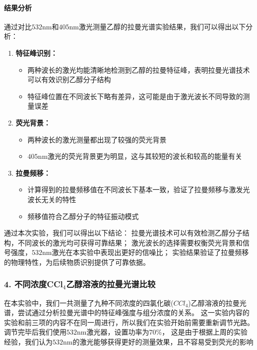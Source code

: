 \documentclass[12pt,a4paper,UTF8]{ctexart}
\begin{document}
\paragraph{结果分析}

通过对比$532\mathrm{nm}$和$405\mathrm{nm}$激光测量乙醇的拉曼光谱实验结果，我们可以得出以下分析：

\begin{enumerate}
    \item \textbf{特征峰识别：}
    \begin{itemize}
        \item 两种波长的激光均能清晰地检测到乙醇的拉曼特征峰，表明拉曼光谱技术可以有效识别乙醇分子结构
        \item 特征峰位置在不同波长下略有差异，这可能是由于激光波长不同导致的测量误差
    \end{itemize}

    \item \textbf{荧光背景：}
    \begin{itemize}
        \item 两种波长的激光测量都出现了较强的荧光背景
        \item $405\mathrm{nm}$激光的荧光背景更为明显，这与其较短的波长和较高的能量有关
    \end{itemize}

    \item \textbf{拉曼频移：}
    \begin{itemize}
        \item 计算得到的拉曼频移值在不同波长下基本一致，验证了拉曼频移与激发光波长无关的特性
        \item 频移值符合乙醇分子的特征振动模式
    \end{itemize}
\end{enumerate}

通过本次实验，我们可以得出以下结论：
拉曼光谱技术可以有效检测乙醇分子结构，不同波长的激光均可获得可靠结果；
激光波长的选择需要权衡荧光背景和信号强度，$532\mathrm{nm}$激光在本实验中表现出更好的信噪比；
实验结果验证了拉曼频移的物理特性，为后续物质识别提供了可靠依据。

\subsubsection*{4. 不同浓度CCl$_4$乙醇溶液的拉曼光谱比较}

在本实验中，我们一共测量了九种不同浓度的四氯化碳($CCl_{4}$)乙醇溶液的拉曼光谱，尝试通过分析拉曼光谱中的特征峰强度与组分浓度的关系。
这一实验内容的实验和前三项的内容不在同一周进行，所以我们在实验开始前需要重新调节光路。
调节完毕后我们使用$ 532\mathrm{nm} $激光器，设置功率为$ 70\%$，
这是由于根据上周的实验经验，我们认为$532\mathrm{nm}$的激光能够获得更好的测量效果，且不容易受到荧光的影响
\end{document}
